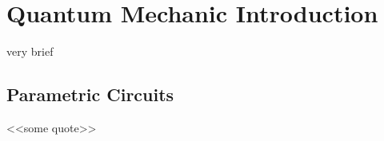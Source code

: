 \chapter{Quantum Mechanic Introduction}\label{chapter:quantum_mechanic_introduction}
very brief
\section{Parametric Circuits}

<<some quote>>
  
